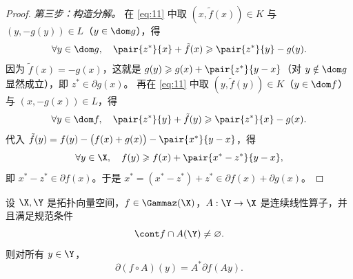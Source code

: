 \begin{proof}
\emph{第三步：构造分解。} 在 \eqref{eq:11} 中取 $(x,\tilde f(x))\in K$ 与 $(y,-g(y))\in L$（$y\in\dom g$），得
\[
  \forall y\in\dom g,\quad\pair{z^*}{x}+\tilde f(x)\geqslant\pair{z^*}{y}-g(y).
\]
因为 $\tilde f(x)=-g(x)$，这就是 $g(y)\geqslant g(x)+\pair{z^*}{y-x}$（对 $y\notin\dom g$ 显然成立），即 $z^*\in\partial g(x)$。
再在 \eqref{eq:11} 中取 $(y,\tilde f(y))\in K$（$y\in\dom f$）与 $(x,-g(x))\in L$，得
\[
  \forall y\in\dom f,\quad\pair{z^*}{y}+\tilde f(y)\geqslant\pair{z^*}{x}-g(x).
\]
代入 $\tilde f(y)=f(y)-\bigl(f(x)+g(x)\bigr)-\pair{x^*}{y-x}$，得
\[
  \forall y\in\X,\quad f(y)\geqslant f(x)+\pair{x^*-z^*}{y-x},
\]
即 $x^*-z^*\in\partial f(x)$。于是 $x^*=(x^*-z^*)+z^*\in\partial f(x)+\partial g(x)$。
\end{proof}

\begin{theorem}
\label{res:41}
设 $\X,\Y$ 是拓扑向量空间，$f\in\Gammaz(\X)$，$A:\Y\to\X$ 是连续线性算子，并且满足规范条件
\[
  \cont f\cap A(\Y)\neq\varnothing .
\]
则对所有 $y\in\Y$，
\[
  \partial(f\circ A)(y)=A^*\partial f(Ay).
\]
\end{theorem}

